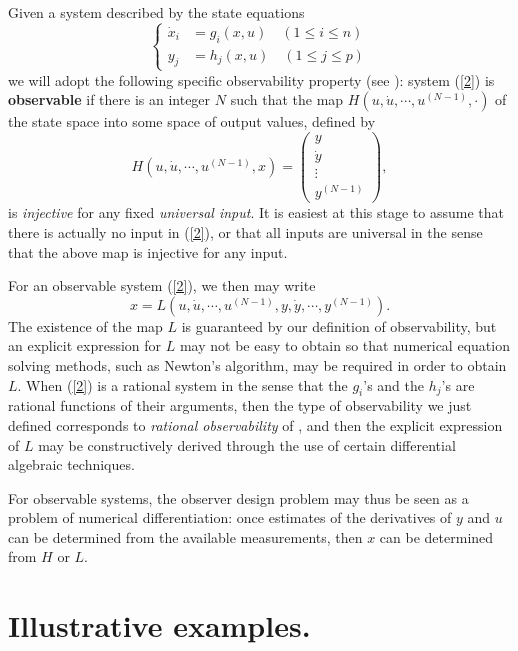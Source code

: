 Given a system described by the state equations
\begin{equation}
\left\{
\begin{array}{rcl}
\dot x_i & = g_i(x, u) \quad (1 \le i \le n)\\
y_j & = h_j(x, u) \quad (1 \le j \le p)\end{array}
\right.
\label{2}
\end{equation}
we will adopt the following specific observability property (see
\cite{grizzle1990b,moraal1992}):
system (\ref{2}) is {\bf observable} if there is an integer $N$ such
that the map $H\left(u, \dot u, \cdots, u^{(N-1)}, \cdot \right)$ of
the state space into some space of output values, defined by
\begin{equation}
H\left(u, \dot u, \cdots, u^{(N-1)}, x \right) = 
\left( 
\begin{array}{c} y \\ \dot
y \\ \vdots \\ y^{(N-1)} \end{array}\right), \label{3}
\end{equation}
is {\it injective} for any fixed {\it universal input}.
It is easiest at this stage to assume that there is actually
no input in (\ref{2}), or that all inputs are universal in the sense that
the above map is injective for any input. 

For an observable system (\ref{2}), we then may write
$$x = L\left(u, \dot u, \cdots, u^{(N-1)}, y, \dot y, \cdots, y^{(N-1)} 
\right).$$
The existence of the map $L$ is guaranteed by our definition of 
observability, but an explicit expression for $L$ may not be easy to 
obtain so that numerical equation solving methods, such as Newton's algorithm,
may be required in order to obtain $L$.  
When (\ref{2}) is a rational system in the sense that the $g_i$'s and the 
$h_j$'s are rational functions of their arguments, then the type of 
observability we just defined corresponds to {\it rational 
observability} of \cite{diop1991d,diop1992b}, and then the explicit
expression of $L$ may be  constructively derived through the use of certain
differential
algebraic techniques.

For observable systems, the observer design problem may thus be 
seen as a problem of numerical differentiation: once estimates of the
derivatives
of $y$ and $u$ can be determined from the available measurements, then $x$ can be
determined from $H$ or $L$.


\section{Illustrative examples.}\setcounter{equation}{0}
\label{examples}

